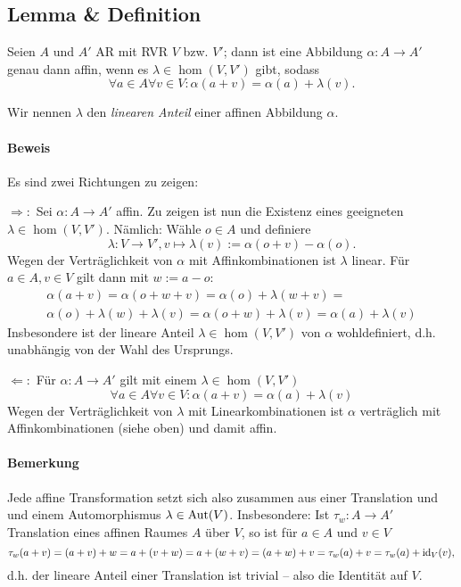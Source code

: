 \subsection{Lemma \& Definition}
	\begin{Lemma}
	Seien $ A $ und $ A' $ AR mit RVR $ V $ bzw. $ V' $; dann ist eine Abbildung $ \alpha:A\to A' $ genau dann affin, wenn es $ \lambda\in\hom(V,V') $ gibt, sodass 
		\[ \forall a\in A\forall v\in V:\alpha(a+v)=\alpha(a)+\lambda(v). \]
	\end{Lemma}
	\begin{Definition}
	Wir nennen $ \lambda $ den \emph{linearen Anteil} einer affinen Abbildung $ \alpha $.
	\end{Definition}
\paragraph{Beweis}
	Es sind zwei Richtungen zu zeigen:
	
	$ \Rightarrow: $ Sei $ \alpha:A\to A' $ affin. Zu zeigen ist nun die Existenz eines geeigneten $ \lambda \in\hom(V,V') $. Nämlich: Wähle $ o\in A $ und definiere
		\[ \lambda:V\to V',v\mapsto \lambda(v):=\alpha(o+v)-\alpha(o). \]
	Wegen der Verträglichkeit von $ \alpha $ mit Affinkombinationen ist $ \lambda $ linear. Für $ a\in A,v\in V $ gilt dann mit $ w:=a-o $:
		\begin{gather*}
		\alpha(a+v) = \alpha(o+w+v) = \alpha(o)+\lambda(w+v) =\\ \alpha(o)+\lambda(w)+\lambda(v) = \alpha(o+w)+\lambda(v) = \alpha(a)+\lambda(v)
		\end{gather*}
	Insbesondere ist der lineare Anteil $ \lambda \in\hom(V,V')$ von $ \alpha $ wohldefiniert, d.h. unabhängig von der Wahl des Ursprungs.
	
	$ \Leftarrow: $ Für $ \alpha:A\to A' $ gilt mit einem $ \lambda\in\hom(V,V') $
		\[ \forall a\in A\forall v\in V:\alpha(a+v)=\alpha(a)+\lambda(v) \]
	Wegen der Verträglichkeit von $ \lambda $ mit Linearkombinationen ist $ \alpha $ verträglich mit Affinkombinationen (siehe oben) und damit affin.
\paragraph{Bemerkung}
	Jede affine Transformation setzt sich also zusammen aus einer Translation und und einem Automorphismus $ \lambda \in \operatorname{Aut}(V) $. Insbesondere: Ist $ \tau_w:A\to A' $ Translation eines affinen Raumes $ A $ über $ V $, so ist für $ a\in A $ und $ v\in V $
		\[ \tau_w(a+v) = (a+v)+w = a+(v+w) = a+(w+v) = (a+w)+v = \tau_w(a)+v = \tau_w(a)+\operatorname{id}_V(v), \]
		d.h. der lineare Anteil einer Translation ist trivial -- also die Identität auf $ V $.
